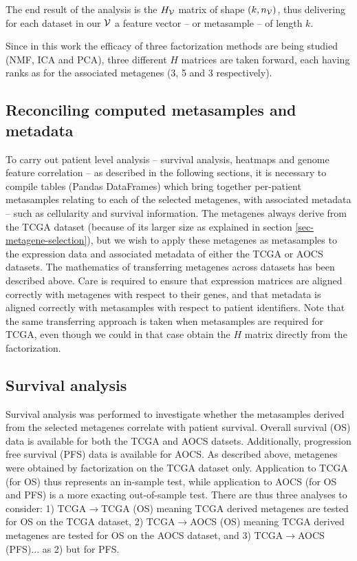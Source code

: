 \documentclass[tikz, 11pt,a4paper,oneside,fleqn]{article}
\begin{document}
The end result of the analysis is the $H_{\mathcal{V}}$ matrix of shape $(k, n_{\mathcal{V}})$, thus delivering for each dataset in our $\mathcal{V}$ a feature vector -- or metasample -- of length $k$. 

Since in this work the efficacy of three factorization methods are being studied (NMF, ICA and PCA), three different $H$ matrices are taken forward, each having ranks as for the associated metagenes (3, 5 and 3 respectively).

\subsection{Reconciling computed metasamples and metadata}
\label{sec-reconciling-metasamples-metadata}

To carry out patient level analysis -- survival analysis, heatmaps and genome feature correlation -- as described in the following sections, it is necessary to compile tables (Pandas DataFrames) which bring together per-patient metasamples relating to each of the selected metagenes, with associated metadata -- such as cellularity and survival information.   The metagenes always derive from the TCGA dataset (because of its larger size as explained in section \ref{sec-metagene-selection}), but we wish to apply these metagenes as metasamples to the expression data and associated metadata of either the TCGA or AOCS datasets.   
The mathematics of transferring metagenes across datasets has been described above.  Care is required to ensure that expression matrices are aligned correctly with metagenes with respect to their genes, and that metadata is aligned correctly with metasamples with respect to patient identifiers.
Note that the same transferring approach is taken when metasamples are required for TCGA, even though we could in that case obtain the $H$ matrix directly from the factorization.


\subsection{Survival analysis}
\label{sec-survival-analysis}

Survival analysis was performed to investigate whether the metasamples derived from the selected metagenes correlate with patient survival.  Overall  survival (OS) data is available for both the TCGA and AOCS datsets.  Additionally, progression free survival (PFS) data is available for AOCS.   As described above,  metagenes were obtained by factorization on the TCGA dataset only.  Application to TCGA (for OS) thus represents an in-sample test, while application to AOCS (for OS and PFS) is a more exacting out-of-sample test. There are thus three analyses to consider: 
1) TCGA$\rightarrow$TCGA (OS) meaning TCGA derived metagenes are tested for OS on the TCGA dataset, 2) TCGA$\rightarrow$AOCS (OS) meaning TCGA derived metagenes are tested for OS on the AOCS dataset, and 3) TCGA$\rightarrow$AOCS (PFS)... as 2) but for PFS. 
\end{document}
